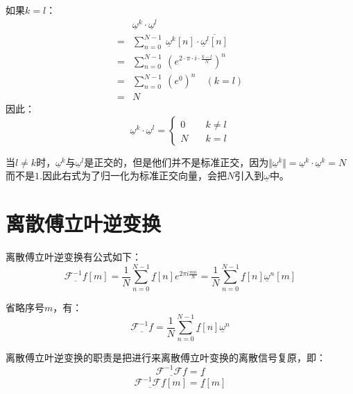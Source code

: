 如果$k=l$：
\begin{align*}
	  & \underline{\omega}^k\cdot \underline{\omega}^l                                          \\
	= & \sum\limits_{n=0}^{N-1}\ \underline{\omega}^k[n]\cdot\overline{\underline{\omega}^l[n]} \\
	= & \sum\limits_{n=0}^{N-1}\ (e^{2\cdot \pi\cdot i\cdot \frac{k-l}{N}})^n                   \\
	= & \sum\limits_{n=0}^{N-1}\ (e^0)^n\quad (k=l)                                             \\
	= & N
\end{align*}
因此：
\begin{equation}
	\underline{\omega}^k\cdot \underline{\omega}^l=
	\begin{cases}
		0\quad & k\neq l \\
		N\quad & k=l
	\end{cases}
\end{equation}

当$l\neq k$时，$\underline{\omega}^k$与$\underline{\omega}^l$是正交的，但是他们并不是标准正交，因为$\Vert \underline{\omega}^k\Vert=\underline{\omega}^k\cdot \underline{\omega}^k=N$而不是$1$.因此右式为了归一化为标准正交向量，会把$N$引入到$\underline{\omega}$中。
\section{离散傅立叶逆变换}

离散傅立叶逆变换有公式如下：
\begin{equation}
	\underline{\mathcal{F}^{-1}f}[m] = \displaystyle{ \frac{1}{N}\sum_{n=0}^{N-1}\underline{f}[n]e^{2\pi i \frac{mn}{N}} = \frac{1}{N}\sum_{n=0}^{N-1}\underline{f}[n]\underline{\omega}^n[m] }
\end{equation}

省略序号$m$，有：
\begin{equation}
	\underline{\mathcal{F}^{-1}f} = \displaystyle{ \frac{1}{N}\sum_{n=0}^{N-1}\underline{f}[n]\underline{\omega}^n }
\end{equation}

离散傅立叶逆变换的职责是把进行来离散傅立叶变换的离散信号复原，即：
\begin{equation}
	\underline{\mathcal{F}^{-1}\mathcal{F}f} = \underline{f}
\end{equation}
\begin{equation}
	\underline{\mathcal{F}^{-1}\mathcal{F}f}[m] = \underline{f}[m]
\end{equation}

